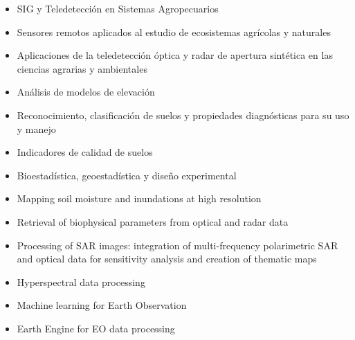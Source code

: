 

\begin{itemize}
\item {SIG y Teledetección en Sistemas Agropecuarios}
\item{Sensores remotos aplicados al estudio de ecosistemas agrícolas y naturales}
\item{Aplicaciones de la teledetección óptica y radar de apertura sintética en las ciencias agrarias y ambientales}
\item{Análisis de modelos de elevación}
\item{Reconocimiento, clasificación de suelos y propiedades diagnósticas para su uso y manejo}
\item{Indicadores de calidad de suelos}
\item{Bioestadística, geoestadística y diseño experimental}
\end{itemize}

\divider


\begin{itemize}
\item{Mapping soil moisture and inundations at high resolution} 
\item{Retrieval of biophysical parameters from optical and radar data} 
\item{Processing of SAR images: integration of multi-frequency polarimetric SAR and optical data for sensitivity analysis
and creation of thematic maps} 
\item{Hyperspectral data processing} 
\item{Machine learning for Earth Observation} 
\item{Earth Engine for EO data processing} 
\end{itemize}


\divider


